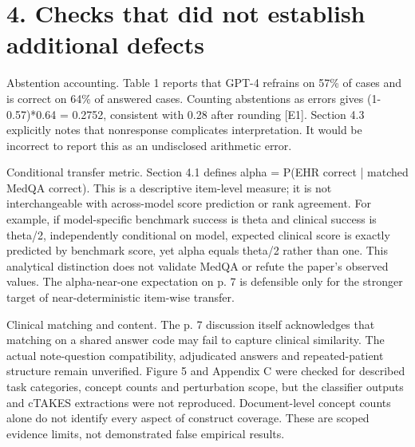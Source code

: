 \documentclass[10pt]{article}
\begin{document}
\section*{4. Checks that did not establish additional defects}
Abstention accounting. Table 1 reports that GPT-4 refrains on 57\% of cases and is correct on 64\% of answered cases. Counting abstentions as errors gives (1-0.57)*0.64 = 0.2752, consistent with 0.28 after rounding [E1]. Section 4.3 explicitly notes that nonresponse complicates interpretation. It would be incorrect to report this as an undisclosed arithmetic error.\par
Conditional transfer metric. Section 4.1 defines alpha = P(EHR correct | matched MedQA correct). This is a descriptive item-level measure; it is not interchangeable with across-model score prediction or rank agreement. For example, if model-specific benchmark success is theta and clinical success is theta/2, independently conditional on model, expected clinical score is exactly predicted by benchmark score, yet alpha equals theta/2 rather than one. This analytical distinction does not validate MedQA or refute the paper’s observed values. The alpha-near-one expectation on p. 7 is defensible only for the stronger target of near-deterministic item-wise transfer.\par
Clinical matching and content. The p. 7 discussion itself acknowledges that matching on a shared answer code may fail to capture clinical similarity. The actual note-question compatibility, adjudicated answers and repeated-patient structure remain unverified. Figure 5 and Appendix C were checked for described task categories, concept counts and perturbation scope, but the classifier outputs and cTAKES extractions were not reproduced. Document-level concept counts alone do not identify every aspect of construct coverage. These are scoped evidence limits, not demonstrated false empirical results.\par
\end{document}
